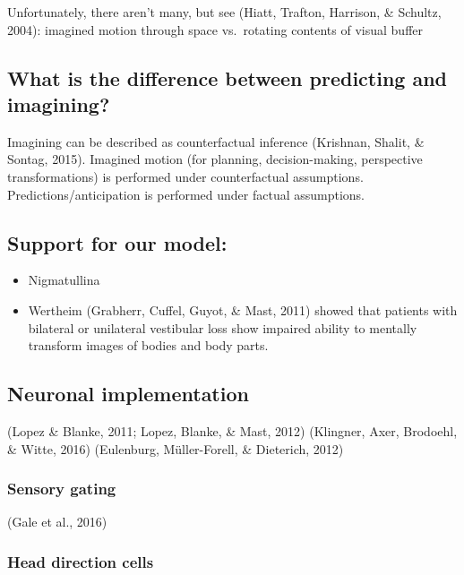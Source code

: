 \documentclass[english,floatsintext,man]{apa6}
\providecommand{\tightlist}{%
  \setlength{\itemsep}{0pt}\setlength{\parskip}{0pt}}
\theoremstyle{definition}
\theoremstyle{definition}
\theoremstyle{remark}
\begin{document}
Unfortunately, there aren't many, but see (Hiatt, Trafton, Harrison, \&
Schultz, 2004): imagined motion through space vs.~rotating contents of
visual buffer

\subsection{What is the difference between predicting and
imagining?}\label{what-is-the-difference-between-predicting-and-imagining}

Imagining can be described as counterfactual inference (Krishnan,
Shalit, \& Sontag, 2015). Imagined motion (for planning,
decision-making, perspective transformations) is performed under
counterfactual assumptions. Predictions/anticipation is performed under
factual assumptions.

\subsection{Support for our model:}\label{support-for-our-model}

\begin{itemize}
\tightlist
\item
  Nigmatullina
\item
  Wertheim (Grabherr, Cuffel, Guyot, \& Mast, 2011) showed that patients
  with bilateral or unilateral vestibular loss show impaired ability to
  mentally transform images of bodies and body parts.
\end{itemize}

\subsection{Neuronal implementation}\label{neuronal-implementation}

(Lopez \& Blanke, 2011; Lopez, Blanke, \& Mast, 2012) (Klingner, Axer,
Brodoehl, \& Witte, 2016) (Eulenburg, Müller-Forell, \& Dieterich, 2012)

\subsubsection{Sensory gating}\label{sensory-gating}

(Gale et al., 2016)

\subsubsection{Head direction cells}\label{head-direction-cells}
\end{document}

